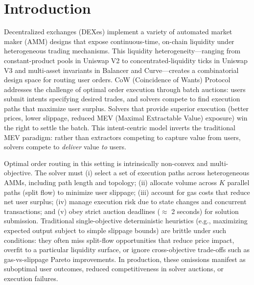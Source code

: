 \documentclass[11pt]{article}
\newcommand{\1}{\mathbf{1}}  %
\begin{document}
\section{Introduction}
Decentralized exchanges (DEXes) implement a variety of automated market maker (AMM) designs that expose continuous-time, on-chain liquidity under heterogeneous trading mechanisms. This liquidity heterogeneity---ranging from constant-product pools in Uniswap V2 to concentrated-liquidity ticks in Uniswap V3 and multi-asset invariants in Balancer and Curve---creates a combinatorial design space for routing user orders. CoW (Coincidence of Wants) Protocol \cite{cowprotocol} addresses the challenge of optimal order execution through batch auctions: users submit intents specifying desired trades, and solvers compete to find execution paths that maximize user surplus. Solvers that provide superior execution (better prices, lower slippage, reduced MEV (Maximal Extractable Value) exposure) win the right to settle the batch. This intent-centric model inverts the traditional MEV paradigm: rather than extractors competing to capture value from users, solvers compete to \emph{deliver} value \emph{to} users.

Optimal order routing in this setting is intrinsically non-convex and multi-objective. The solver must (i) select a set of execution paths across heterogeneous AMMs, including path length and topology; (ii) allocate volume across $K$ parallel paths (split flow) to minimize user slippage; (iii) account for gas costs that reduce net user surplus; (iv) manage execution risk due to state changes and concurrent transactions; and (v) obey strict auction deadlines ($\approx$ 2 seconds) for solution submission. Traditional single-objective deterministic heuristics (e.g., maximizing expected output subject to simple slippage bounds) are brittle under such conditions: they often miss split-flow opportunities that reduce price impact, overfit to a particular liquidity surface, or ignore cross-objective trade-offs such as gas-vs-slippage Pareto improvements. In production, these omissions manifest as suboptimal user outcomes, reduced competitiveness in solver auctions, or execution failures.
\end{document}
